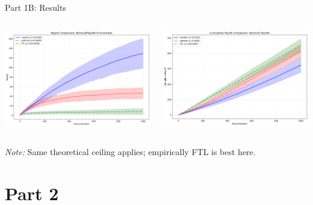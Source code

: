 \documentclass{beamer}
\begin{document}
\begin{frame}{Part 1B: Results}
\begin{columns}[T,onlytextwidth]
  \centering
  \includegraphics[width=\linewidth]{../figures/bernoulli_regret_comparison.png}

  \centering
  \includegraphics[width=\linewidth]{figures/BP_payoff.png}
\end{columns}
\vspace{0.3em}
\small \textit{Note:} Same theoretical ceiling applies; empirically FTL is best here.
\end{frame}

\section{Part 2}

\end{document}
